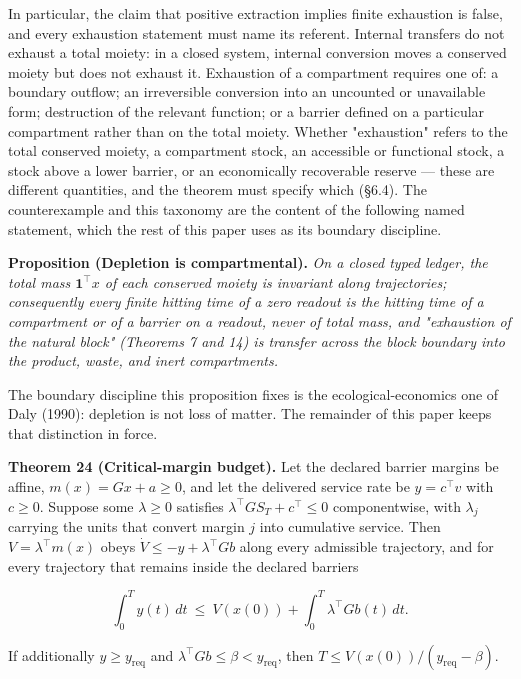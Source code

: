 \documentclass[11pt]{article}
\begin{document}
In particular, the claim that positive extraction implies finite exhaustion is false, and every exhaustion statement must name its referent. Internal transfers do not exhaust a total moiety: in a closed system, internal conversion moves a conserved moiety but does not exhaust it. Exhaustion of a compartment requires one of: a boundary outflow; an irreversible conversion into an uncounted or unavailable form; destruction of the relevant function; or a barrier defined on a particular compartment rather than on the total moiety. Whether "exhaustion" refers to the total conserved moiety, a compartment stock, an accessible or functional stock, a stock above a lower barrier, or an economically recoverable reserve --- these are different quantities, and the theorem must specify which (\S6.4). The counterexample and this taxonomy are the content of the following named statement, which the rest of this paper uses as its boundary discipline.

\textbf{Proposition (Depletion is compartmental).} \emph{On a closed typed ledger, the total mass \(\mathbf{1}^\top x\) of each conserved moiety is invariant along trajectories; consequently every finite hitting time of a zero readout is the hitting time of a compartment or of a barrier on a readout, never of total mass, and "exhaustion of the natural block" (Theorems 7 and 14) is transfer across the block boundary into the product, waste, and inert compartments.}

The boundary discipline this proposition fixes is the ecological-economics one of Daly (1990): depletion is not loss of matter. The remainder of this paper keeps that distinction in force.

\textbf{Theorem 24 (Critical-margin budget).} Let the declared barrier margins be affine, \(m(x)=Gx+a\ge0\), and let the delivered service rate be \(y=c^{\top}v\) with \(c\ge0\). Suppose some \(\lambda\ge0\) satisfies \(\lambda^{\top}GS_T+\allowbreak{}c^{\top}\le0\) componentwise, with \(\lambda_j\) carrying the units that convert margin \(j\) into cumulative service. Then \(V=\lambda^{\top}m(x)\) obeys \(\dot V\le-y+\lambda^{\top}Gb\) along every admissible trajectory, and for every trajectory that remains inside the declared barriers 

$$\int_0^Ty(t)\,dt\ \le\ V(x(0))+\int_0^T\lambda^{\top}Gb(t)\,dt .$$

 If additionally \(y\ge y_{\mathrm{req}}\) and \(\lambda^{\top}Gb\le\beta<y_{\mathrm{req}}\), then \(T\le V(x(0))/(y_{\mathrm{req}}-\beta)\).
\end{document}
